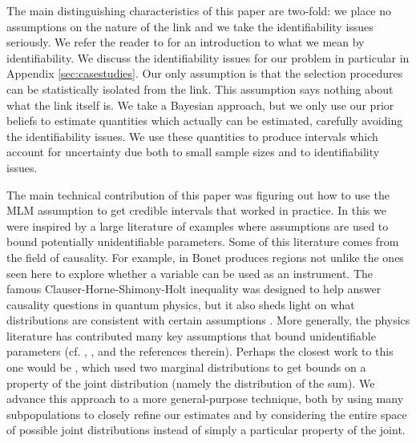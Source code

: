 The main distinguishing characteristics of this paper are two-fold: we place no assumptions on the nature of the link and we take the identifiability issues seriously.  We refer the reader to \cite{walter2014identifiability} for an introduction to what we mean by identifiability.  We discuss the identifiability issues for our problem in particular in Appendix \ref{sec:casestudies}.  Our only assumption is that the selection procedures can be statistically isolated from the link.  This assumption says nothing about what the link itself is.  We take a Bayesian approach, but we only use our prior beliefs to estimate quantities which actually can be estimated, carefully avoiding the identifiability issues.  We use these quantities to produce intervals which account for uncertainty due both to small sample sizes and to identifiability issues.

The main technical contribution of this paper was figuring out how to use the MLM assumption to get credible intervals that worked in practice.  In this we were inspired by a large literature of examples where assumptions are used to bound potentially unidentifiable parameters.  Some of this literature comes from the field of causality.  For example, in \cite{bonet2001instrumentality} Bonet produces regions not unlike the ones seen here to explore whether a variable can be used as an instrument.  The famous Clauser-Horne-Shimony-Holt inequality was designed to help answer causality questions in quantum physics, but it also sheds light on what distributions are consistent with certain assumptions \cite{clauser1969proposed}.  More generally, the physics literature has contributed many key assumptions that bound unidentifiable parameters (cf. \cite{chaves2014inferring}, \cite{kela2017semidefinite}, and the references therein).  Perhaps the closest work to this one would be \cite{makarov1982estimates}, which used two marginal distributions to get bounds on a property of the joint distribution (namely the distribution of the sum).  We advance this approach to a more general-purpose technique, both by using many subpopulations to closely refine our estimates and by considering the entire space of possible joint distributions instead of simply a particular property of the joint.  

%                                                    


